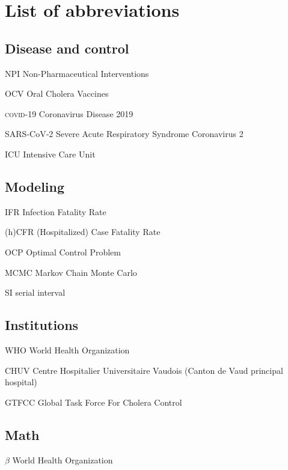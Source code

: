 \chapter*{List of abbreviations}
\begin{fullwidth}
	
\section{Disease and control}
\begin{abbreviations}
    \item[NPI] Non-Pharmaceutical Interventions
    \item[OCV] Oral Cholera Vaccines
    \item[\textsc{covid}-19] Coronavirus Disease 2019
    \item[SARS‑CoV‑2] Severe Acute Respiratory Syndrome Coronavirus 2
     \item[ICU] Intensive Care Unit
\end{abbreviations}
\section{Modeling}
\begin{abbreviations}
        \item[IFR] Infection Fatality Rate
     \item[(h)CFR] (Hospitalized) Case Fatality Rate
     \item[OCP] Optimal Control Problem
     \item[MCMC] Markov Chain Monte Carlo
     \item[SI] serial interval
     \end{abbreviations}
\section{Institutions}
\begin{abbreviations}
    \item[WHO] World Health Organization
     \item[CHUV] Centre Hospitalier Universitaire Vaudois (Canton de Vaud principal hospital)
     \item[GTFCC] Global Task Force For Cholera Control
     \end{abbreviations}


\section{Math}
\begin{abbreviations}
    \item[$\beta$] World Health Organization
     \end{abbreviations}
\end{fullwidth}

